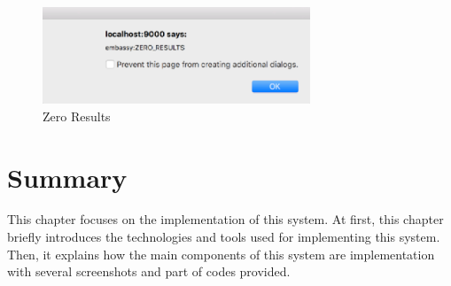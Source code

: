 \begin{figure}[H]
  \centering
  \includegraphics[width=8cm]{./img/Picture28}
  \caption{Zero Results}
  \label{Figure:figex}
\end{figure}



\section{Summary}


This chapter focuses on the implementation of this system. At first, this chapter briefly introduces the technologies and tools used for implementing this system. Then, it explains how the main components of this system are implementation with several screenshots and part of codes provided.


